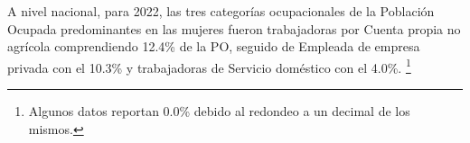 A nivel nacional, para 2022, las tres categorías ocupacionales de la Población Ocupada predominantes en las mujeres fueron trabajadoras por Cuenta propia no agrícola comprendiendo 12.4\% de la PO, seguido de Empleada de empresa privada con el 10.3\% y trabajadoras de Servicio doméstico con el 4.0\%. \footnote{Algunos datos reportan 0.0\% debido al redondeo a un decimal de los mismos.}
